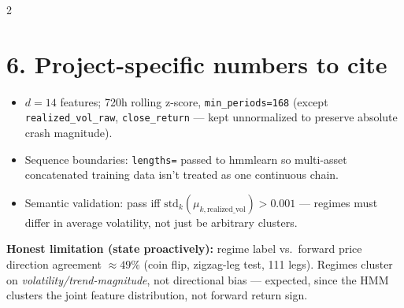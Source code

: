 \documentclass[9pt]{extarticle}
\begin{document}
\begin{multicols}{2}
\section{6. Project-specific numbers to cite}
\begin{itemize}
\item $d=14$ features; 720h rolling z-score, \texttt{min\_periods=168}
(except \texttt{realized\_vol\_raw}, \texttt{close\_return} --- kept unnormalized to preserve absolute crash magnitude).
\item Sequence boundaries: \texttt{lengths=} passed to hmmlearn so multi-asset
concatenated training data isn't treated as one continuous chain.
\item Semantic validation: pass iff $\text{std}_k(\mu_{k,\text{realized\_vol}}) > 0.001$
--- regimes must differ in average volatility, not just be arbitrary clusters.
\end{itemize}

\begin{tcolorbox}[colback=red!5,colframe=red!40!black,boxrule=0.5pt,arc=1pt,left=4pt,right=4pt,top=3pt,bottom=3pt]
\textbf{Honest limitation (state proactively):} regime label vs.\ forward
price direction agreement $\approx 49\%$ (coin flip, zigzag-leg test, 111
legs). Regimes cluster on \emph{volatility/trend-magnitude}, not directional
bias --- expected, since the HMM clusters the joint feature distribution, not
forward return sign.
\end{tcolorbox}

\end{multicols}
\end{document}
